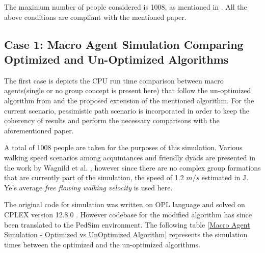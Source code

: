The maximum number of people considered is 1008, as mentioned in \cite{ref5}. All the above conditions are compliant with the mentioned paper.

\subsection{Case 1: Macro Agent Simulation Comparing Optimized and Un-Optimized Algorithms}
\label{sec: Case 1: Macro Agent Simulation Comparing Optimized and Un-Optimized Algorithms}

The first case is depicts the CPU run time comparison between macro agents(single or no group concept is present here) that follow the un-optimized algorithm from \cite{ref5} and the proposed extension of the mentioned algorithm. For the current scenario, pessimistic path scenario is incorporated in order to keep the coherency of results and perform the necessary comparisons with the aforementioned paper.

A total of 1008 people are taken for the purposes of this simulation. Various walking speed scenarios among acquintances and friendly dyads are presented in the work by Wagnild et al. \cite{ref24}, however since there are no complex group formations that are currently part of the simulation, the speed of 1.2 $m/s$ estimated in J. Ye's average \textit{free flowing walking velocity} \cite{ref25} is used here.

The original code for simulation was written on OPL language and solved on CPLEX version 12.8.0 \cite{ref5}. However codebase for the modified algorithm has since been translated to the PedSim environment. The following table \ref{Macro Agent Simulation - Optimized vs UnOptimized Algorithm} represents the simulation times between the optimized and the un-optimized algorithms.
 

